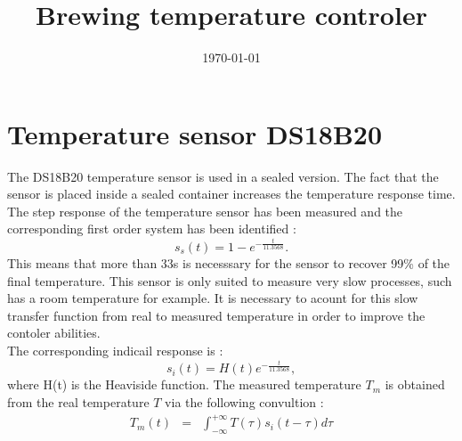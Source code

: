 \documentclass[article,letterpaper,12pt]{article}
\date{\today}
\title{Brewing temperature controler}
\begin{document}
\maketitle

\section*{Temperature sensor DS18B20}
\label{sec-1}
The DS18B20 temperature sensor is used in a sealed version. The fact that the sensor is placed inside a sealed container increases the temperature response time.
The step response of the temperature sensor has been measured and the corresponding first order system has been identified :
\begin{equation}
s_s(t) = 1 - e^{-\frac{t}{11.3568}}.
\end{equation}
This means that more than 33s is necesssary for the sensor to recover 99\% of the final temperature. This sensor is only suited to measure very slow processes, such has a room temperature for example.
It is necessary to acount for this slow transfer function from real to measured temperature in order to improve the contoler abilities.\\
The corresponding indicail response is :
\begin{equation}
s_i(t) = H(t) e^{-\frac{t}{11.3568}},
\end{equation}
where H(t) is the Heaviside function. The measured temperature $T_m$ is obtained from the real
temperature $T$ via the following convultion :
\begin{eqnarray}
T_m(t) &= &\int_{-\infty}^{+\infty} T(\tau) s_i(t-\tau) d \tau\\
\end{eqnarray}
\end{document}
